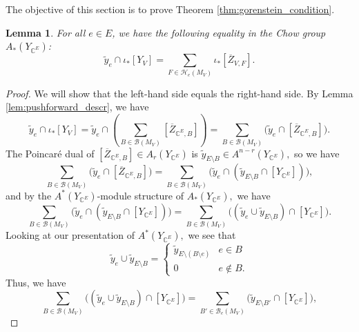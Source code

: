 \documentclass{amsart}
\theoremstyle{plain}
\newtheorem{lemma}[theorem]{Lemma}
\theoremstyle{definition}
\begin{document}
The objective of this section is to prove Theorem \ref{thm:gorenstein_condition}. 

\begin{lemma}
\label{lem:multiplication_identity}
For all $e\in E$, we have the following equality in the Chow group $A_*(Y_{\mathbb{C}^E})$:
\begin{equation*}
\label{eq:multiplication_identity_1}
\tilde{y}_e \cap \iota_*[Y_V] = \sum_{F \in \mathcal{H}_e(M_V)} \iota_*[\overline{Z}_{V, F}].
\end{equation*}
\end{lemma}

\begin{proof}
    We will show that the left-hand side equals the right-hand side. By Lemma \ref{lem:pushforward_descr}, we have
    \begin{equation*}
    \label{eq:multiplication_identity_2}    
    \tilde{y}_e \cap \iota_*[Y_V]= \tilde{y}_e \cap \left( \sum_{B \in \mathcal{B}(M_V)} [\overline{Z}_{\mathbb{C}^E,B}] \right) = \sum_{B \in \mathcal{B}(M_V)} \big( \tilde{y}_e \cap [\overline{Z}_{\mathbb{C}^E,B}] \big).
    \end{equation*}
    The Poincar\'e dual of $[\overline{Z}_{\mathbb{C}^E,B}] \in A_{r}(Y_{\mathbb{C}^E})$ is $\tilde{y}_{E \setminus B} \in A^{n-r}(Y_{\mathbb{C}^E}),$ so we have
    \[\sum_{B \in \mathcal{B}(M_V)} \big( \tilde{y}_e \cap [\overline{Z}_{\mathbb{C}^E,B}] \big)= \sum_{B \in \mathcal{B}(M_V)} \big( \tilde{y}_e \cap (\tilde{y}_{E \setminus B} \cap [Y_{\mathbb{C}^E}])\big),\]
    and by the $A^*(Y_{\mathbb{C}^E})$-module structure of $A_*(Y_{\mathbb{C}^E}),$ we have
    \[\sum_{B \in \mathcal{B}(M_V)} \big( \tilde{y}_e \cap (\tilde{y}_{E \setminus B} \cap [Y_{\mathbb{C}^E}])\big) = \sum_{B \in \mathcal{B}(M_V)} \big( (\tilde{y}_e \cup \tilde{y}_{E \setminus B}) \cap[Y_{\mathbb{C}^E}]\big).\]
    Looking at our presentation of $A^*(Y_{\mathbb{C}^E}),$ we see that
    \begin{equation*}
    \tilde{y}_e \cup \tilde{y}_{E \setminus B}=
    \begin{cases}
    \tilde{y}_{E \setminus (B \setminus e)} & e \in B \\
    0 & e \notin B.
    \end{cases}        
    \end{equation*}
    Thus, we have
    \[\sum_{B \in \mathcal{B}(M_V)} \big( (\tilde{y}_e \cup \tilde{y}_{E \setminus B}) \cap[Y_{\mathbb{C}^E}]\big) = \sum_{B' \in \mathcal{B}_e(M_V)} \big( \tilde{y}_{E \setminus B'} \cap[Y_{\mathbb{C}^E}]\big),\]

\end{proof}
\end{document}
